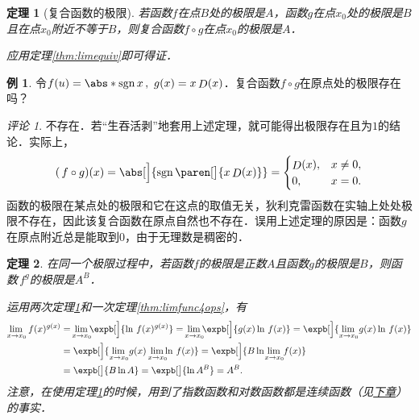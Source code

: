 \documentclass[a4paper,punct=CCT]{ctexbook}
\makeatletter
\newtheorem{theorem}{定理}
\theoremstyle{definition}
\newtheorem*{example*}{例}
\theoremstyle{remark}
\newtheorem*{remark}{评论}
\renewenvironment{proof}[1][\proofname]{\par
  \pushQED{\qed}%
  \normalfont \topsep6\p@\@plus6\p@\relax
  \trivlist
  \item[]\ignorespaces
}{%
  \popQED\endtrivlist\@endpefalse
}
\makeatother
\begin{document}
\begin{theorem}[复合函数的极限]
  \label{thm:limfunccomp}
  若函数\(f\)在点\(B\)处的极限是\(A\)，函数\(g\)在点\(x_0\)处的极限是\(B\)且在点\(x_0\)附近不等于\(B\)，则复合函数\(f \circ g\)在点\(x_0\)的极限是\(A\)．

  \begin{proof}
    应用定理\ref{thm:limequiv}即可得证．
  \end{proof}
\end{theorem}

\begin{example*}
  令\(f(u) = \abs*{\sgn x}\,,\ g(x) = x \Fn D(x)\)．复合函数\(f \circ g\)在原点处的极限存在吗？

  \begin{remark}
    不存在．若“生吞活剥”地套用上述定理，就可能得出极限存在且为\(1\)的结论．实际上，
    \begin{equation*}
      (\,f \circ g)(x)
      = \abs[\Big]{\sgn\paren[\big]{x \Fn D(x)}} =
      \begin{cases}
        \Fn D(x), & x \ne 0, \\
        0, & x = 0.
      \end{cases}
    \end{equation*}
    函数的极限在某点处的极限和它在这点的取值无关，狄利克雷函数在实轴上处处极限不存在，因此该复合函数在原点自然也不存在．误用上述定理的原因是：函数\(g\)在原点附近总是能取到\(0\)，由于无理数是稠密的．
  \end{remark}
\end{example*}

\begin{theorem}
  \label{thm:limfuncpowexp}
  在同一个极限过程中，若函数\(f\)的极限是正数\(A\)且函数\(g\!\)的极限是\(B\)，则函数\(\,f^g\!\)的极限是\(A^B\)．

  \begin{proof}
    运用两次定理\ref{thm:limfunccomp}和一次定理\ref{thm:limfunc4ops}，有
    \begin{align*}
      \lim_{x \to x_0\!} \,f(x)^{g(x)}
      &= {}\smashoperator{\lim_{x \to x_0\!}} \expb[\Big]{\ln \,f(x)^{g(x)}}
        = {}\smashoperator{\lim_{x \to x_0\!}} \expb[\Big]{g(x) \ln \,f(x)}
        = \expb[\Big]{\lim_{x \to x_0\!} g(x) \ln \,f(x)} \\
      &= \expb[\Big]{\lim_{x \to x_0\!} g(x) \smashoperator[r]{\lim_{x \to x_0\!}} \ln \,f(x)}
        = \expb[\Big]{B \ln {}\smashoperator{\lim_{x \to x_0\!}} \,f(x)} \\
      &= \expb[\big]{B \ln A} = \expb[\big]{\ln A^B} = A^B.
    \end{align*}
    注意，在使用定理\ref{thm:limfunccomp}的时候，用到了指数函数和对数函数都是连续函数（见\hyperref[chap:cont]{下章}）的事实．
  \end{proof}
\end{theorem}
\end{document}
